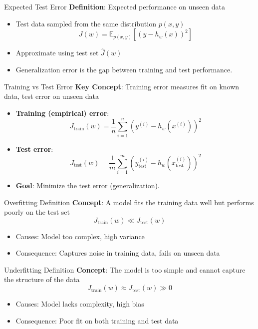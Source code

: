 \documentclass[serif, aspectratio=169]{beamer}
\begin{document}
\begin{frame}{Expected Test Error}
    \textbf{Definition}: Expected performance on unseen data
    \begin{itemize}
        \item Test data sampled from the same distribution \( p(x, y) \)
        \[
        J(w) = \mathbb{E}_{p(x,y)}[(y - h_w(x))^2]
        \]
        \item Approximate using test set \( \hat{J}(w) \)
        \item Generalization error is the gap between training and test performance.
    \end{itemize}
\end{frame}

\begin{frame}{Training vs Test Error}
    \textbf{Key Concept}: Training error measures fit on known data, test error on unseen data
    \begin{itemize}
        \item \textbf{Training (empirical) error}:
        \[
        J_{\text{train}}(w) = \frac{1}{n} \sum_{i=1}^{n} \left( y^{(i)} - h_w(x^{(i)}) \right)^2
        \]
        \item \textbf{Test error}:
        \[
        J_{\text{test}}(w) = \frac{1}{m} \sum_{i=1}^{m} \left(y_{\text{test}}^{(i)} - h_w(x_{\text{test}}^{(i)})\right)^2
        \]
        \item \textbf{Goal}: Minimize the test error (generalization).
    \end{itemize}
\end{frame}

\begin{frame}{Overfitting Definition}
    \textbf{Concept}: A model fits the training data well but performs poorly on the test set
    \[
    J_{\text{train}}(w) \ll J_{\text{test}}(w)
    \]
    \begin{itemize}
        \item Causes: Model too complex, high variance
        \item Consequence: Captures noise in training data, fails on unseen data
    \end{itemize}
\end{frame}



\begin{frame}{Underfitting Definition}
    \textbf{Concept}: The model is too simple and cannot capture the structure of the data
    \[
    J_{\text{train}}(w) \approx J_{\text{test}}(w) \gg 0
    \]
    \begin{itemize}
        \item Causes: Model lacks complexity, high bias
        \item Consequence: Poor fit on both training and test data
    \end{itemize}
\end{frame}
\end{document}
